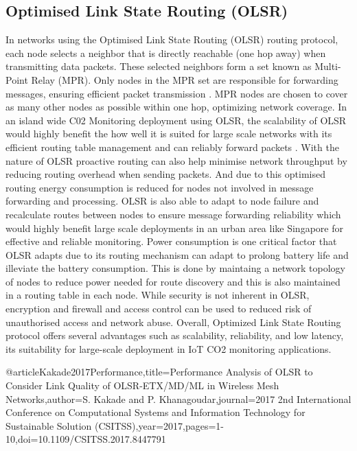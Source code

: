 \subsection*{Optimised Link State Routing (OLSR)}

In networks using the Optimised Link State Routing (OLSR) routing protocol, each node selects a neighbor that is directly reachable (one hop away) when transmitting data packets. These selected neighbors form a set known as Multi-Point Relay (MPR). Only nodes in the MPR set are responsible for forwarding messages, ensuring efficient packet transmission\cite{Kakade2017Performance} \cite{OLSR_IETF}. MPR nodes are chosen to cover as many other nodes as possible within one hop, optimizing network coverage\cite{Ahn2014-ii}. 
In an island wide C02  Monitoring deployment using OLSR, the scalability of OLSR would highly benefit the how well it is suited for large scale networks with its efficient routing table management and can reliably forward packets . 
With the nature of OLSR proactive routing can also help minimise network throughput by reducing routing overhead when sending packets. And due to this optimised routing energy consumption is reduced for nodes not involved in message forwarding and processing\cite{Guo_2011}.
OLSR is also able to adapt to node failure and recalculate routes between nodes to ensure message forwarding reliability which would highly benefit large scale deployments in an urban area like Singapore for effective and reliable monitoring.
Power consumption is one critical factor that OLSR adapts due to its routing mechanism can adapt to prolong battery life and illeviate the battery consumption\cite{Jubair_2019}. This is done by maintaing a network topology of nodes to reduce power needed for route discovery and this is also maintained in a routing table in each node.
While security is not inherent in OLSR, encryption and firewall and access control can be used to reduced risk of unauthorised access and network abuse.
Overall, Optimized Link State Routing protocol offers several advantages such as scalability, reliability, and low latency, its suitability for large-scale deployment in IoT CO2 monitoring applications.


@article{Kakade2017Performance,title={Performance Analysis of OLSR to Consider Link Quality of OLSR-ETX/MD/ML in Wireless Mesh Networks},author={S. Kakade and P. Khanagoudar},journal={2017 2nd International Conference on Computational Systems and Information Technology for Sustainable Solution (CSITSS)},year={2017},pages={1-10},doi={10.1109/CSITSS.2017.8447791}}

